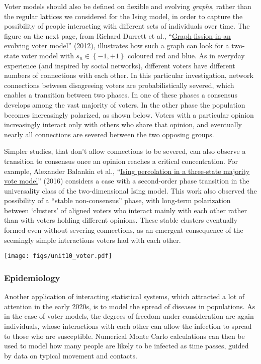Voter models should also be defined on flexible and evolving \textit{graphs}, rather than the regular lattices we considered for the Ising model, in order to capture the possibility of people interacting with different sets of individuals over time.
The figure on the next page, from Richard Durrett et al., ``\href{https://doi.org/10.1073/pnas.1200709109}{Graph fission in an evolving voter model}'' (2012), illustrates how such a graph can look for a two-state voter model with $s_n \in \left\{-1, +1\right\}$ coloured red and blue.
As in everyday experience (and inspired by social networks), different voters have different numbers of connections with each other.
In this particular investigation, network connections between disagreeing voters are probabilistically severed, which enables a transition between two phases.
In one of these phases a consensus develops among the vast majority of voters.
In the other phase the population becomes increasingly polarized, as shown below.
Voters with a particular opinion increasingly interact only with others who share that opinion, and eventually nearly all connections are severed between the two opposing groups.

Simpler studies, that don't allow connections to be severed, can also observe a transition to consensus once an opinion reaches a critical concentration.
For example, Alexander Balankin et al., ``\href{https://doi.org/10.1016/j.physleta.2016.12.001}{Ising percolation in a three-state majority vote model}'' (2016) considers a case with a second-order phase transition in the universality class of the two-dimensional Ising model.
This work also observed the possibility of a ``stable non-consensus'' phase, with long-term polarization between `clusters' of aligned voters who interact mainly with each other rather than with voters holding different opinions.
These stable clusters eventually formed even without severing connections, as an emergent consequence of the seemingly simple interactions voters had with each other.

\begin{center}\texttt{[image: figs/unit10\_voter.pdf]}\end{center}

\subsubsection*{Epidemiology}
Another application of interacting statistical systems, which attracted a lot of attention in the early 2020s, is to model the spread of diseases in populations.
As in the case of voter models, the degrees of freedom under consideration are again individuals, whose interactions with each other can allow the infection to spread to those who are susceptible.
Numerical Monte Carlo calculations can then be used to model how many people are likely to be infected as time passes, guided by data on typical movement and contacts.

